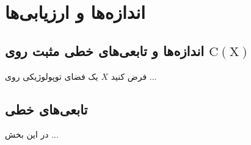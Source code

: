 \chapter{اندازه‌ها و ارزیابی‌ها}
\thispagestyle{empty}
\section{اندازه‌ها و تابعی‌های خطی مثبت روی $\mathrm{C(X)}$}
فرض کنید $X$ یک فضای توپولوژیکی روی ...
\section{تابعی‌های خطی}
در این بخش ...